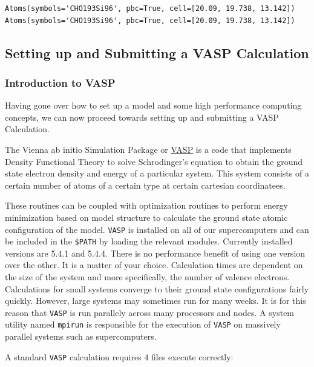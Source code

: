 \documentclass[11pt]{article}
\begin{document}
    \begin{Verbatim}[commandchars=\\\{\}]
Atoms(symbols='CHO193Si96', pbc=True, cell=[20.09, 19.738, 13.142])
Atoms(symbols='CHO193Si96', pbc=True, cell=[20.09, 19.738, 13.142])

    \end{Verbatim}

    \subsection{Setting up and Submitting a VASP
Calculation}\label{setting-up-and-submitting-a-vasp-calculation}

\subsubsection{Introduction to VASP}\label{introduction-to-vasp}

Having gone over how to set up a model and some high performance
computing concepts, we can now proceed towards setting up and submitting
a VASP Calculation.

The Vienna ab initio Simulation Package or
\href{https://www.vasp.at/}{VASP} is a code that implements Density
Functional Theory to solve Schrodinger's equation to obtain the ground
state electron density and energy of a particular system. This system
consists of a certain number of atoms of a certain type at certain
cartesian coordinatees.

These routines can be coupled with optimization routines to perform
energy minimization based on model structure to calculate the ground
state atomic configuration of the model. \texttt{VASP} is installed on
all of our supercomputers and can be included in the \texttt{\$PATH} by
loading the relevant modules. Currently installed versions are 5.4.1 and
5.4.4. There is no performance benefit of using one version over the
other. It is a matter of your choice. Calculation times are dependent on
the size of the system and more specifically, the number of valence
electrons. Calculations for small systems converge to their ground state
configurations fairly quickly. However, large systems may sometimes run
for many weeks. It is for this reason that \texttt{VASP} is run
parallely across many processors and nodes. A system utility named
\texttt{mpirun} is responsible for the execution of \texttt{VASP} on
massively parallel systems such as supercomputers.

A standard \texttt{VASP} calculation requires 4 files execute correctly:
\end{document}
